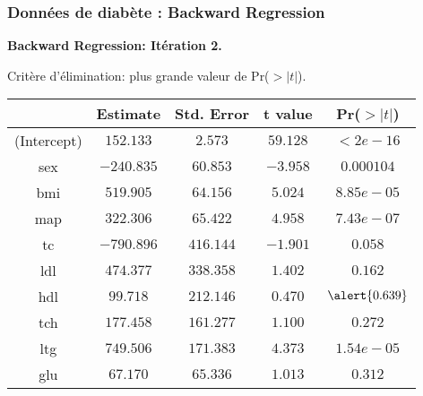 \documentclass{beamer}
\begin{document}
\begin{frame}
\frametitle{Données de diab\`ete : Backward Regression}

\centerline{\bf Backward Regression: Itération 2.}


\begin{center}

\alert{Crit\`ere d'élimination: plus grande valeur de}
Pr($>|t|$).

\vspace{4mm}

{\small
\begin{tabular}{|c||c|c|c|c|}
\hline &Estimate&Std. Error&t value&Pr($>|t|$)\\\hline (Intercept)
&$152.133$&$2.573$&$59.128$&$< 2e-16$
\\\hline
sex &$-240.835$&$60.853$&$-3.958$&$0.000104$\\
bmi&$519.905$&$64.156$&$5.024$&$8.85e-05$\\\hline
map&$322.306$&$65.422$&$4.958$&$7.43e-07$\\
tc&$-790.896$&$416.144$&$-1.901$&$0.058$\\\hline
ldl&$474.377$&$338.358$&$1.402$&$0.162$\\
\alert{ hdl}&$99.718$&$212.146 $&$0.470$&$\alert{
0.639}$\\\hline
tch&$177.458$&$161.277$&$ 1.100$&$0.272$\\
ltg&$749.506$&$ 171.383$&$4.373$&$ 1.54e-05$\\\hline glu&$67.170$&$
65.336$&$1.013$&$0.312$\\\hline
\end{tabular}
}
\end{center}
\end{frame}
\end{document}
